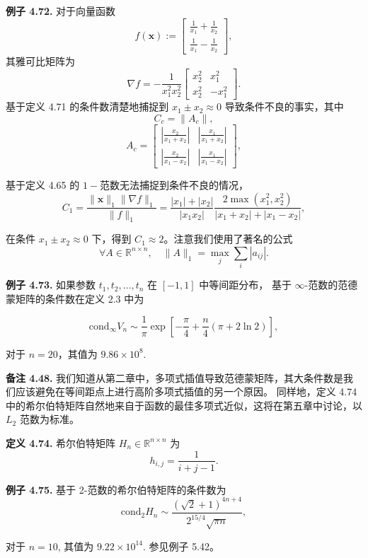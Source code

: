 \documentclass[a4paper]{ctexart}
\begin{document}
{\noindent \textbf{例子 4.72.} 对于向量函数
\[
  f(\mathbf{x}) := \begin{bmatrix} \frac{1}{x_1} + \frac{1}{x_2} \\ \frac{1}{x_1} - \frac{1}{x_2} \end{bmatrix},
\]
其雅可比矩阵为
\[
  \nabla f = -\frac{1}{x_1^2 x_2^2} \begin{bmatrix} x_2^2 & x_1^2 \\ x_2^2 & -x_1^2 \end{bmatrix}.
\]
基于定义 4.71 的条件数清楚地捕捉到 \( x_1 \pm x_2 \approx 0 \) 导致条件不良的事实，其中
\[
  C_c = \|A_c\|,
\]
\[
  A_c = \begin{bmatrix} \left| \frac{x_2}{x_1 + x_2} \right| & \left| \frac{x_1}{x_1 + x_2} \right| \\ 
    \left| \frac{x_2}{x_1 - x_2} \right| & \left| \frac{x_1}{x_1 - x_2} \right| \end{bmatrix},
\]

基于定义 4.65 的 $1-$范数无法捕捉到条件不良的情况，
\[
  C_1 = \frac{\|\mathbf{x}\|_1 \|\nabla f\|_1}{\|f\|_1} = \frac{|x_1| + |x_2|}{|x_1 x_2|} \frac{2 \max(x_1^2, x_2^2)}{|x_1 + x_2| + |x_1 - x_2|},
\]

在条件 \( x_1 \pm x_2 \approx 0 \) 下，得到 \( C_1 \approx 2 \)。注意我们使用了著名的公式
\[
  \forall A \in \mathbb{R}^{n \times n}, \quad \|A\|_1 = \max_j \sum_i |a_{ij}|.
\]

\noindent \textbf{例子 4.73.} 如果参数 \( t_1, t_2, \ldots, t_n \) 在 \([-1, 1]\) 中等间距分布，
基于 \(\infty\)-范数的范德蒙矩阵的条件数在定义 2.3 中为

\[
\text{cond}_{\infty} V_n \sim \frac{1}{\pi} \exp \left[ -\frac{\pi}{4} + \frac{n}{4} (\pi + 2 \ln 2) \right],
\]

对于 \( n = 20 \)，其值为 \( 9.86 \times 10^8 \).

\noindent \textbf{备注 4.48.} 我们知道从第二章中，多项式插值导致范德蒙矩阵，其大条件数是我们应该避免在等间距点上进行高阶多项式插值的另一个原因。
同样地，定义 4.74 中的希尔伯特矩阵自然地来自于函数的最佳多项式近似，这将在第五章中讨论，以 \( L_2 \) 范数为标准。

\noindent \textbf{定义 4.74.} 希尔伯特矩阵 \( H_n \in \mathbb{R}^{n \times n} \) 为
\[
h_{i,j} = \frac{1}{i + j - 1}.
\]

\noindent \textbf{例子 4.75.} 基于 2-范数的希尔伯特矩阵的条件数为
\[
  \text{cond}_2 H_n \sim \frac{(\sqrt{2} + 1)^{4n + 4}}{2^{15/4} \sqrt{\pi n}},
\]

对于 \( n = 10 \), 其值为 \( 9.22 \times 10^{14} \). 参见例子 5.42。

}
\end{document}
